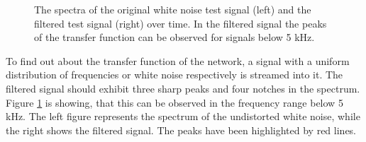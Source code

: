 \documentclass[a4paper,twocolumn]{esapub2005} %
\begin{document}
\begin{figure}
\caption{
The spectra of the original white noise test signal (left) and the filtered test signal (right) over time.
In the filtered signal the peaks of the transfer function can be observed for signals below 5 kHz.
}
\label{fig:prelim_results}
\end{figure}

To find out about the transfer function of the network,
a signal with a uniform distribution of frequencies or white noise respectively is streamed into it.
The filtered signal should exhibit three sharp peaks and four notches in the spectrum.
Figure \ref{fig:prelim_results} is showing, that this can be observed in the frequency range below 5 kHz.
The left figure represents the spectrum of the undistorted white noise, while the right shows the filtered signal.
The peaks have been highlighted by red lines.
\end{document}

